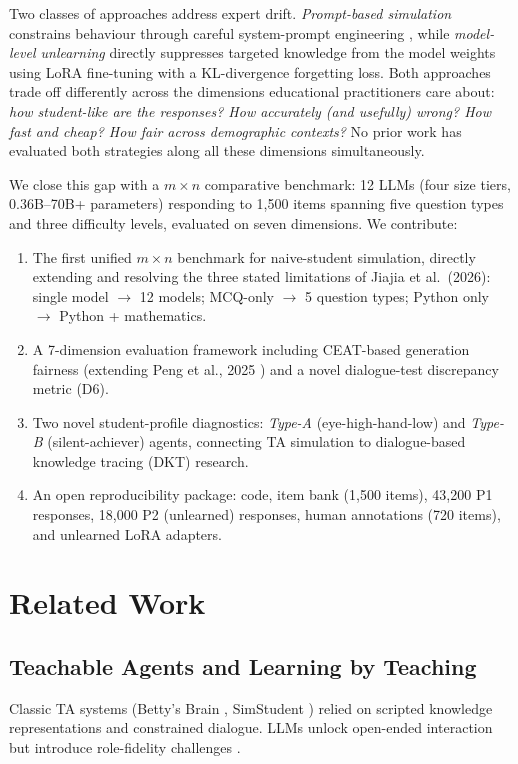 \documentclass[10pt,twocolumn]{IEEEtran}
\begin{document}
Two classes of approaches address expert drift.
\textit{Prompt-based simulation} constrains behaviour through careful system-prompt
engineering \cite{Lu_2024, martynova2025can}, while
\textit{model-level unlearning} \cite{Jiajia2026} directly suppresses targeted
knowledge from the model weights using LoRA fine-tuning with a KL-divergence
forgetting loss. Both approaches trade off differently across the dimensions
educational practitioners care about: \textit{how student-like are the responses?
How accurately (and usefully) wrong? How fast and cheap? How fair across
demographic contexts?} No prior work has evaluated both strategies along all these
dimensions simultaneously.

We close this gap with a \(m \times n\) comparative benchmark:
12 LLMs (four size tiers, 0.36B–70B+ parameters) responding to 1,500 items
spanning five question types and three difficulty levels, evaluated on seven
dimensions. We contribute:

\begin{enumerate}
\item The first unified \(m \times n\) benchmark for naive-student simulation,
  directly extending and resolving the three stated limitations of Jiajia et al.\
  (2026): single model \(\to\) 12 models; MCQ-only \(\to\) 5 question types;
  Python only \(\to\) Python + mathematics.
\item A 7-dimension evaluation framework including CEAT-based generation fairness
  (extending Peng et al., 2025 \cite{peng2025ceat}) and a novel dialogue-test
  discrepancy metric (D6).
\item Two novel student-profile diagnostics: \textit{Type-A} (eye-high-hand-low)
  and \textit{Type-B} (silent-achiever) agents, connecting TA simulation to
  dialogue-based knowledge tracing (DKT) research.
\item An open reproducibility package: code, item bank (1,500 items), 43,200
  P1 responses, 18,000 P2 (unlearned) responses, human annotations (720 items),
  and unlearned LoRA adapters.
\end{enumerate}

\section{Related Work}

\subsection{Teachable Agents and Learning by Teaching}
Classic TA systems (Betty's Brain \cite{biswas2016design}, SimStudent
\cite{matsuda2022teachable}) relied on scripted knowledge representations and
constrained dialogue. LLMs unlock open-ended interaction \cite{chen2024learning,
ma2024teach} but introduce role-fidelity challenges \cite{rogers2025playing}.
\end{document}
